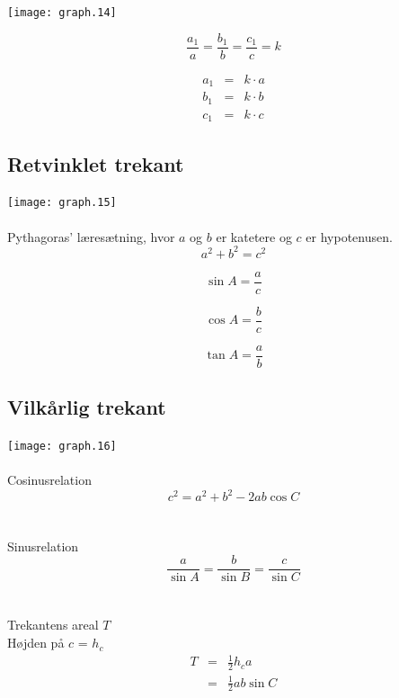 \documentclass[11pt,a5paper,fleqn,leqno]{book}
\begin{document}
\texttt{[image: graph.14]}

\begin{equation}
\frac{a_1}{a} = \frac{b_1}{b} = \frac{c_1}{c} = k
\end{equation}

\begin{eqnarray}
a_1 & = & k \cdot a \\
b_1 & = & k \cdot b \nonumber \\
c_1 & = & k \cdot c \nonumber
\end{eqnarray}

\vfill

\subsection{Retvinklet trekant}

\texttt{[image: graph.15]}
\\
\\
Pythagoras' læresætning, hvor $a$ og $b$ er katetere og $c$ er hypotenusen.
\begin{equation} \label{eq:trekant_pythagoras}
a^2 + b^2 = c^2
\end{equation}

\begin{equation}
\sin A = \frac{a}{c}
\end{equation}

\begin{equation}
\cos A = \frac{b}{c}
\end{equation}

\begin{equation}
\tan A = \frac{a}{b}
\end{equation}

\vfill

\subsection{Vilkårlig trekant}

\texttt{[image: graph.16]}
\\
\\
Cosinusrelation
\begin{equation}
c^2 = a^2 + b^2 - 2ab\cos C
\end{equation}
\\
\\
Sinusrelation
\begin{equation}
\frac{a}{\sin A} = \frac{b}{\sin B} = \frac{c}{\sin C}
\end{equation}
\\
\\
Trekantens areal $T$ \\
Højden på $c$ = $h_c$
\begin{eqnarray}
T & = & \frac{1}{2}h_c a \\
& = & \frac{1}{2}ab\sin C \nonumber
\end{eqnarray}
\end{document}
